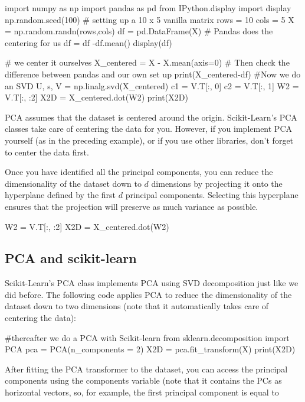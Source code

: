 \documentclass[%
oneside,                 %
final,                   %
10pt]{article}
\begin{document}
\bpycod
import numpy as np
import pandas as pd
from IPython.display import display
np.random.seed(100)
# setting up a 10 x 5 vanilla matrix 
rows = 10
cols = 5
X = np.random.randn(rows,cols)
df = pd.DataFrame(X)
# Pandas does the centering for us
df = df -df.mean()
display(df)

# we center it ourselves
X_centered = X - X.mean(axis=0)
# Then check the difference between pandas and our own set up
print(X_centered-df)
#Now we do an SVD
U, s, V = np.linalg.svd(X_centered)
c1 = V.T[:, 0]
c2 = V.T[:, 1]
W2 = V.T[:, :2]
X2D = X_centered.dot(W2)
print(X2D)

\epycod


PCA assumes that the dataset is centered around the origin. Scikit-Learn’s PCA classes take care of centering
the data for you. However, if you implement PCA yourself (as in the preceding example), or if you use other libraries, don’t
forget to center the data first.

Once you have identified all the principal components, you can reduce the dimensionality of the dataset
down to $d$ dimensions by projecting it onto the hyperplane defined by the first $d$ principal components.
Selecting this hyperplane ensures that the projection will preserve as much variance as possible. 



\bpycod
W2 = V.T[:, :2]
X2D = X_centered.dot(W2)

\epycod


\subsection{PCA and scikit-learn}

Scikit-Learn’s PCA class implements PCA using SVD decomposition just like we did before. The
following code applies PCA to reduce the dimensionality of the dataset down to two dimensions (note
that it automatically takes care of centering the data):






\bpycod
#thereafter we do a PCA with Scikit-learn
from sklearn.decomposition import PCA
pca = PCA(n_components = 2)
X2D = pca.fit_transform(X)
print(X2D)

\epycod

After fitting the PCA transformer to the dataset, you can access the principal components using the
components variable (note that it contains the PCs as horizontal vectors, so, for example, the first
principal component is equal to 
\end{document}
